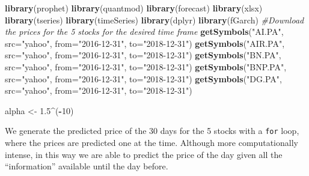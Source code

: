 \documentclass[
  11pt,
]{article}
\newenvironment{Shaded}{\begin{snugshade}}{\end{snugshade}}
\newcommand{\CommentTok}[1]{\textcolor[rgb]{0.56,0.35,0.01}{\textit{#1}}}
\newcommand{\DataTypeTok}[1]{\textcolor[rgb]{0.13,0.29,0.53}{#1}}
\newcommand{\DecValTok}[1]{\textcolor[rgb]{0.00,0.00,0.81}{#1}}
\newcommand{\FloatTok}[1]{\textcolor[rgb]{0.00,0.00,0.81}{#1}}
\newcommand{\KeywordTok}[1]{\textcolor[rgb]{0.13,0.29,0.53}{\textbf{#1}}}
\newcommand{\NormalTok}[1]{#1}
\newcommand{\OperatorTok}[1]{\textcolor[rgb]{0.81,0.36,0.00}{\textbf{#1}}}
\newcommand{\StringTok}[1]{\textcolor[rgb]{0.31,0.60,0.02}{#1}}
\begin{document}
\begin{Shaded}
\begin{Highlighting}[]
\KeywordTok{library}\NormalTok{(prophet)}
\KeywordTok{library}\NormalTok{(quantmod)}
\KeywordTok{library}\NormalTok{(forecast)}
\KeywordTok{library}\NormalTok{(xlsx)}
\KeywordTok{library}\NormalTok{(tseries)}
\KeywordTok{library}\NormalTok{(timeSeries)}
\KeywordTok{library}\NormalTok{(dplyr)}
\KeywordTok{library}\NormalTok{(fGarch)}
\CommentTok{#Download the prices for the 5 stocks for the desired time frame}
\KeywordTok{getSymbols}\NormalTok{(}\StringTok{"AI.PA"}\NormalTok{, }\DataTypeTok{src=}\StringTok{"yahoo"}\NormalTok{, }\DataTypeTok{from=}\StringTok{"2016-12-31"}\NormalTok{, }\DataTypeTok{to=}\StringTok{"2018-12-31"}\NormalTok{)}
\KeywordTok{getSymbols}\NormalTok{(}\StringTok{"AIR.PA"}\NormalTok{, }\DataTypeTok{src=}\StringTok{"yahoo"}\NormalTok{, }\DataTypeTok{from=}\StringTok{"2016-12-31"}\NormalTok{, }\DataTypeTok{to=}\StringTok{"2018-12-31"}\NormalTok{)}
\KeywordTok{getSymbols}\NormalTok{(}\StringTok{"BN.PA"}\NormalTok{, }\DataTypeTok{src=}\StringTok{"yahoo"}\NormalTok{, }\DataTypeTok{from=}\StringTok{"2016-12-31"}\NormalTok{, }\DataTypeTok{to=}\StringTok{"2018-12-31"}\NormalTok{)}
\KeywordTok{getSymbols}\NormalTok{(}\StringTok{"BNP.PA"}\NormalTok{, }\DataTypeTok{src=}\StringTok{"yahoo"}\NormalTok{, }\DataTypeTok{from=}\StringTok{"2016-12-31"}\NormalTok{, }\DataTypeTok{to=}\StringTok{"2018-12-31"}\NormalTok{)}
\KeywordTok{getSymbols}\NormalTok{(}\StringTok{"DG.PA"}\NormalTok{, }\DataTypeTok{src=}\StringTok{"yahoo"}\NormalTok{, }\DataTypeTok{from=}\StringTok{"2016-12-31"}\NormalTok{, }\DataTypeTok{to=}\StringTok{"2018-12-31"}\NormalTok{)}

\NormalTok{alpha <-}\StringTok{ }\FloatTok{1.5}\OperatorTok{^}\NormalTok{(}\OperatorTok{-}\DecValTok{10}\NormalTok{)}
\end{Highlighting}
\end{Shaded}

We generate the predicted price of the 30 days for the 5 stocks with a
\texttt{for} loop, where the prices are predicted one at the time.
Although more computationally intense, in this way we are able to
predict the price of the day given all the ``information'' available
until the day before.
\end{document}
